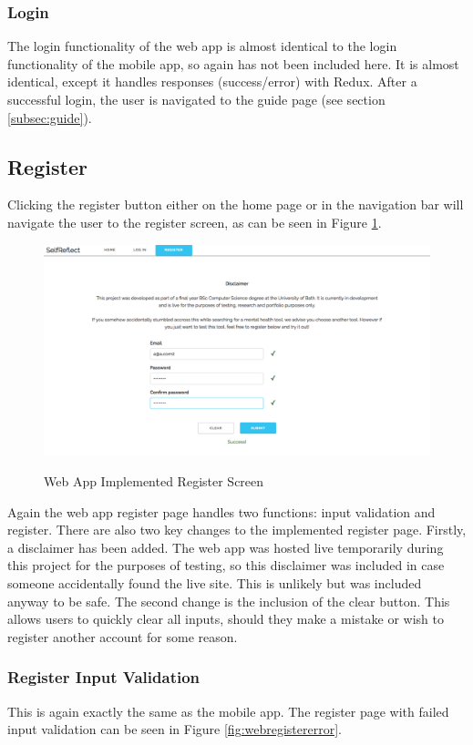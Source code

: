 \documentclass[11pt,openright,a4paper]{report}
\begin{document}
\subsubsection{Login}
The login functionality of the web app is almost identical to the login functionality of the mobile app, so again has not been included here. It is almost identical, except it handles responses (success/error) with Redux. After a successful login, the user is navigated to the guide page (see section \ref{subsec:guide}).

\subsection{Register}
Clicking the register button either on the home page or in the navigation bar will navigate the user to the register screen, as can be seen in Figure \ref{fig:webregisterimpl}.

\begin{figure}[ht]
\centering
\caption{Web App Implemented Register Screen}
\includegraphics[width=\textwidth]{i/webregisterimpl.png}
\label{fig:webregisterimpl}
\end{figure}

Again the web app register page handles two functions: input validation and register. There are also two key changes to the implemented register page. Firstly, a disclaimer has been added. The web app was hosted live temporarily during this project for the purposes of testing, so this disclaimer was included in case someone accidentally found the live site. This is unlikely but was included anyway to be safe. The second change is the inclusion of the clear button. This allows users to quickly clear all inputs, should they make a mistake or wish to register another account for some reason.

\newpage
\subsubsection{Register Input Validation}
This is again exactly the same as the mobile app. The register page with failed input validation can be seen in Figure \ref{fig:webregistererror}.
\end{document}
